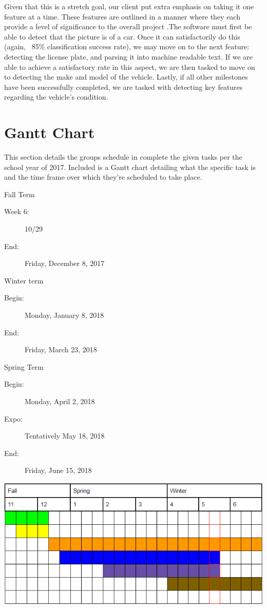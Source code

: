 \documentclass[onecolumn, draftclsnofoot,10pt, compsoc]{IEEEtran}
\begin{document}
Given that this is a stretch goal, our client put extra emphasis on taking it one feature at a time. These features are outlined in a manner where they each provide a level of significance to the overall project .The software must first be able to detect that the picture is of a car.  Once it can satisfactorily do this (again, ~85\% classification success rate), we may move on to the next feature: detecting the license plate, and parsing it into machine readable text. If we are able to achieve a satisfactory rate in this aspect, we are then tasked to move on to detecting the make and model of the vehicle. Lastly, if all other milestones have been successfully completed, we are tasked with detecting key features regarding the vehicle's condition. 

\section{Gantt Chart}

This section details the groups schedule in complete the given tasks per the school year of 2017. Included is a Gantt chart detailing what the specific task is and the time frame over which they're scheduled to take place.

Fall Term
\begin{description}
	\item[Week 6:]10/29
	\item[End:]   Friday, December 8, 2017
\end{description}


Winter term
\begin{description}
	\item[Begin:]Monday, January 8, 2018
	\item[End:]	 Friday, March 23, 2018
\end{description}


Spring Term
\begin{description}
	\item[Begin:]Monday, April 2, 2018
	\item[Expo:] 	Tentatively May 18, 2018
	\item[End:]			Friday, June 15, 2018
\end{description}



\includegraphics[scale = 1]{GantProjectReqs.PNG}
\end{document}
